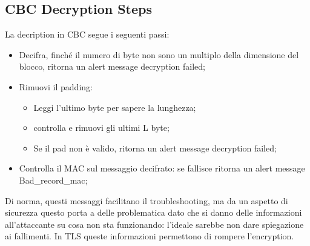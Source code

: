 \documentclass{article}
\theoremstyle{remark}
\begin{document}
\subsection{CBC Decryption Steps}
La decription in CBC segue i seguenti passi:\begin{itemize}
	\item Decifra, finché il numero di byte non sono un multiplo della dimensione del blocco, ritorna un alert message decryption failed;
	\item Rimuovi il padding:\begin{itemize}
		      \item Leggi l'ultimo byte per sapere la lunghezza;
		      \item controlla e rimuovi gli ultimi L byte;
		      \item Se il pad non è valido, ritorna un alert message decryption failed;
	      \end{itemize}
	\item Controlla il MAC sul messaggio decifrato: se fallisce ritorna un alert message Bad\_record\_mac;
\end{itemize}
Di norma, questi messaggi facilitano il troubleshooting, ma da un aspetto di sicurezza questo porta a delle problematica dato che si danno delle informazioni all'attaccante su cosa non sta funzionando: l'ideale sarebbe non dare spiegazione ai fallimenti.\newline
In TLS queste informazioni permettono di rompere l'encryption.
\end{document}
